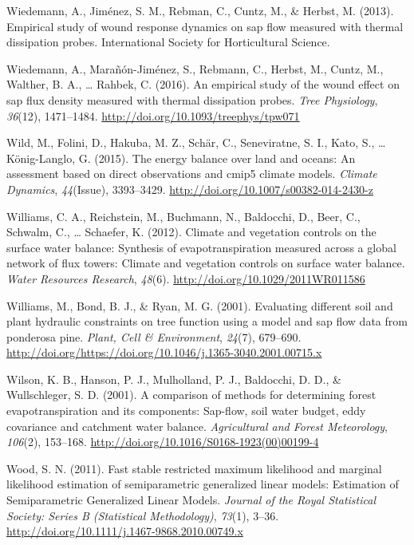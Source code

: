 \documentclass[11pt,twoside]{reedthesis}
\begin{document}
\hypertarget{ref-Wiedemann2013}{}
Wiedemann, A., Jiménez, S. M., Rebman, C., Cuntz, M., \& Herbst, M.
(2013). Empirical study of wound response dynamics on sap flow measured
with thermal dissipation probes. International Society for Horticultural
Science.

\hypertarget{ref-Wiedemann2016}{}
Wiedemann, A., Marañón-Jiménez, S., Rebmann, C., Herbst, M., Cuntz, M.,
Walther, B. A., \ldots{} Rahbek, C. (2016). An empirical study of the
wound effect on sap flux density measured with thermal dissipation
probes. \emph{Tree Physiology}, \emph{36}(12), 1471--1484.
\url{http://doi.org/10.1093/treephys/tpw071}

\hypertarget{ref-Wild2015}{}
Wild, M., Folini, D., Hakuba, M. Z., Schär, C., Seneviratne, S. I.,
Kato, S., \ldots{} König-Langlo, G. (2015). The energy balance over land
and oceans: An assessment based on direct observations and cmip5 climate
models. \emph{Climate Dynamics}, \emph{44}(Issue), 3393--3429.
\url{http://doi.org/10.1007/s00382-014-2430-z}

\hypertarget{ref-williams_climate_2012}{}
Williams, C. A., Reichstein, M., Buchmann, N., Baldocchi, D., Beer, C.,
Schwalm, C., \ldots{} Schaefer, K. (2012). Climate and vegetation
controls on the surface water balance: Synthesis of evapotranspiration
measured across a global network of flux towers: Climate and vegetation
controls on surface water balance. \emph{Water Resources Research},
\emph{48}(6). \url{http://doi.org/10.1029/2011WR011586}

\hypertarget{ref-Williams2001}{}
Williams, M., Bond, B. J., \& Ryan, M. G. (2001). Evaluating different
soil and plant hydraulic constraints on tree function using a model and
sap flow data from ponderosa pine. \emph{Plant, Cell \& Environment},
\emph{24}(7), 679--690.
\url{http://doi.org/https://doi.org/10.1046/j.1365-3040.2001.00715.x}

\hypertarget{ref-Wilson2001}{}
Wilson, K. B., Hanson, P. J., Mulholland, P. J., Baldocchi, D. D., \&
Wullschleger, S. D. (2001). A comparison of methods for determining
forest evapotranspiration and its components: Sap-flow, soil water
budget, eddy covariance and catchment water balance. \emph{Agricultural
and Forest Meteorology}, \emph{106}(2), 153--168.
\url{http://doi.org/10.1016/S0168-1923(00)00199-4}

\hypertarget{ref-wood_fast_2011}{}
Wood, S. N. (2011). Fast stable restricted maximum likelihood and
marginal likelihood estimation of semiparametric generalized linear
models: Estimation of Semiparametric Generalized Linear Models.
\emph{Journal of the Royal Statistical Society: Series B (Statistical
Methodology)}, \emph{73}(1), 3--36.
\url{http://doi.org/10.1111/j.1467-9868.2010.00749.x}
\end{document}
